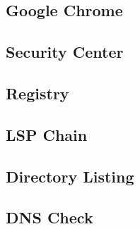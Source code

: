 \subsection{Google Chrome}

\subsection{Security Center}

\subsection{Registry}
\subsection{LSP Chain}

\subsection{Directory Listing}

\subsection{DNS Check}

